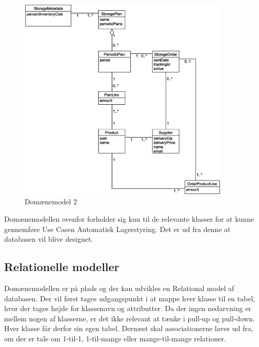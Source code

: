 \begin{figure}[H]
    \centering
    \includegraphics[width=0.9\textwidth]{figures/krav/domain_model_2.eps}
    \caption{Domænemodel 2}
    \label{fig:domain_model_2}
\end{figure}

Domænemodellen ovenfor forholder sig kun til de relevante klasser for at kunne gennemføre Use Casen Automatisk Lagerstyring. Det er ud fra denne at databasen vil blive designet.

\subsection{Relationelle modeller}
Domænemodellen er på plads og der kan udvikles en Relational model af databasen\cite{DatabaseSystems}. Der vil først tages udgangspunkt i at mappe hver klasse til en tabel, hvor der tages højde for klassenavn og attributter.
Da der ingen nedarvning er mellem nogen af klasserne, er det ikke relevant at tænke i pull-up og pull-down\cite{Larman2004}. Hver klasse får derfor sin egen tabel.
Dernæst skal associationerne laves ud fra, om der er tale om 1-til-1, 1-til-mange eller mange-til-mange relationer\cite{DatabaseSystems}. 

